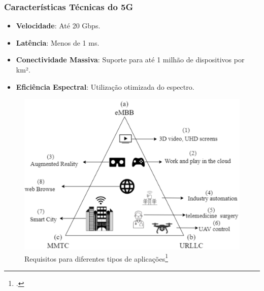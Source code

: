 \begin{frame}
    \frametitle{Características Técnicas do 5G}
    \begin{itemize}
        \item \textbf{Velocidade}: Até 20 Gbps.
        \item \textbf{Latência}: Menos de 1 ms.
        \item \textbf{Conectividade Massiva}: Suporte para até 1 milhão de dispositivos por km².
        \item \textbf{Eficiência Espectral}: Utilização otimizada do espectro.
    \end{itemize}
    \begin{figure}
        \centering
        \includegraphics[width=0.5\linewidth]{figs/5G_verticais.png}
        \caption{Requisitos para diferentes tipos de aplicações\footcite{5G_verticais}}
    \end{figure}
\end{frame}

